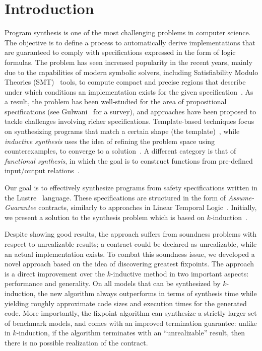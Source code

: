 
\section{Introduction}

Program synthesis is one of the most challenging problems in computer science. The objective is to define a process to automatically derive implementations that are guaranteed to comply with specifications expressed in the form of logic formulas. The problem has seen increased popularity in the recent years, mainly due to the capabilities of modern symbolic solvers, including Satisfiability Modulo Theories (SMT)~\cite{BarFT-SMTLIB} tools, to compute compact and precise regions that describe under which conditions an implementation exists for the given specification~\cite{reynolds2015counterexample}.
As a result, the problem has been well-studied for the area of propositional specifications (see Gulwani~\cite{gulwani2010dimensions} for a survey), and approaches have been proposed to tackle challenges involving richer specifications. Template-based techniques focus on synthesizing programs that match a certain shape (the template)~\cite{srivastava2013template}, while {\em inductive synthesis} uses the idea of refining the problem space using counterexamples, to converge to a solution~\cite{flener2001inductive}. A different category is that of \textit{functional synthesis}, in which the goal is to construct functions from pre-defined input/output relations~\cite{kuncak2013functional}.

Our goal is to effectively synthesize programs from safety specifications written in the Lustre~\cite{lustrev6} language.  These specifications are structured in the form of {\em Assume-Guarantee} contracts, similarly to approaches in Linear Temporal Logic~\cite{ringert2017synthesis}. Initially, we present a solution to the synthesis problem which is based on $k$-induction~\cite{gacek2015towards,katis2016towards}.

Despite showing good results, the approach suffers from soundness problems with respect to unrealizable results; a contract could be declared as unrealizable, while an actual implementation exists. To combat this soundness issue, we developed a novel approach based on the idea of discovering greatest fixpoints. The approach is a direct improvement over the $k$-inductive method in two important aspects: performance and generality.  On all models that can be synthesized by $k$-induction, the new algorithm always outperforms in terms of synthesis time while yielding roughly approximate code sizes and execution times for the generated code. More importantly, the fixpoint algorithm can synthesize a strictly larger set of benchmark models, and comes with an improved termination guarantee: unlike in $k$-induction, if the algorithm terminates with an ``unrealizable'' result, then there is no possible realization of the contract.

